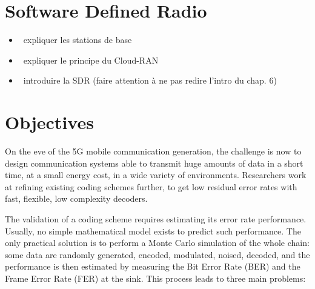 

\section{Software Defined Radio}

\begin{itemize}
  \item \xmark~expliquer les stations de base
  \item \xmark~expliquer le principe du Cloud-RAN
  \item \xmark~introduire la SDR (faire attention à ne pas redire l'intro du
    chap. 6)
\end{itemize}

\section{Objectives}


On the eve of the 5G mobile communication generation, the challenge is now to
design communication systems able to transmit huge amounts of data in a short
time, at a small energy cost, in a wide variety of environments. Researchers
work at refining existing coding schemes further, to get low residual error
rates with fast, flexible, low complexity decoders.

The validation of a coding scheme requires estimating its error rate
performance. Usually, no simple mathematical model exists to predict such
performance. The only practical solution is to perform a Monte Carlo simulation
of the whole chain: some data are randomly generated, encoded, modulated,
noised, decoded, and the performance is then estimated by measuring the Bit
Error Rate (BER) and the Frame Error Rate (FER) at the sink. This process leads
to three main problems:


